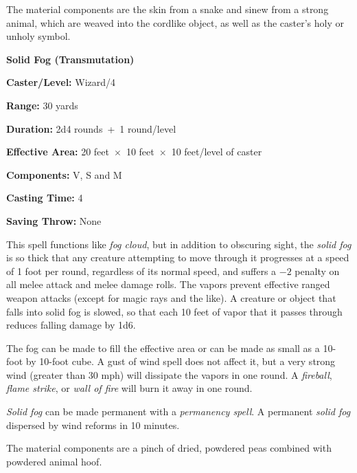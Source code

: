 \begin{multicols}{2}
The material components are the skin from a snake and sinew from a strong animal, which are weaved into the cordlike object, as well as the caster's holy or unholy symbol.

\vspace{1em}

\noindent
\begin{minipage}{\columnwidth}

\noindent \textbf{Solid Fog (Transmutation)}

\noindent \textbf{Caster/Level:} Wizard/4

\noindent \textbf{Range:} 30 yards

\noindent \textbf{Duration:} 2d4 rounds~+~1 round/level

\noindent \textbf{Effective Area:} 20 feet~$\times$~10 feet~$\times$~10 feet/level of caster

\noindent \textbf{Components:} V, S and M

\noindent \textbf{Casting Time:} 4

\noindent \textbf{Saving Throw:} None

\end{minipage}

This spell functions like \textit{fog cloud}, but in addition to obscuring sight, the \textit{solid fog} is so thick that any creature attempting to move through it progresses at a speed of 1 foot per round, regardless of its normal speed, and suffers a $-2$ penalty on all melee attack and melee damage rolls.  The vapors prevent effective ranged weapon attacks (except for magic rays and the like).  A creature or object that falls into solid fog is slowed, so that each 10 feet of vapor that it passes through reduces falling damage by 1d6.

The fog can be made to fill the effective area or can be made as small as a 10-foot by 10-foot cube.  A gust of wind spell does not affect it, but a very strong wind (greater than 30 mph) will dissipate the vapors in one round.  A \textit{fireball}, \textit{flame strike}, or \textit{wall of fire} will burn it away in one round.

\textit{Solid fog} can be made permanent with a \textit{permanency spell}.  A permanent \textit{solid fog} dispersed by wind reforms in 10 minutes. 

The material components are a pinch of dried, powdered peas combined with powdered animal hoof.

\vspace{1em}


\end{multicols}
